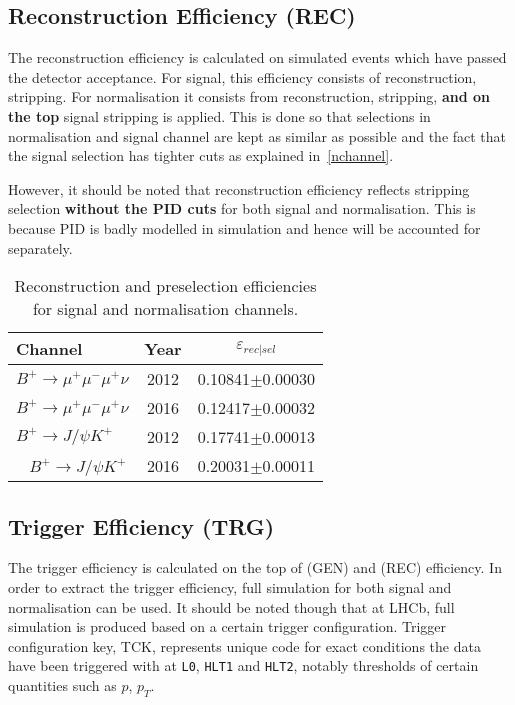 \subsection{Reconstruction Efficiency (REC)}
The reconstruction efficiency is calculated on simulated events which have passed the detector acceptance. For signal, this efficiency consists of reconstruction, stripping. For normalisation it consists from reconstruction, stripping, \textbf{and on the top} signal stripping is applied. This is done so that selections in normalisation and signal channel are kept as similar as possible and the fact that the signal selection has tighter cuts as explained in~\autoref{nchannel}.

However, it should be noted that reconstruction efficiency reflects stripping selection \textbf{without the PID cuts} for both signal and normalisation. This is because \gls{PID} is badly modelled in simulation and hence will be accounted for separately.

  \begin{table}[H]
                \begin{center}
        \begin{tabular}{l c c }

		Channel & Year & $\varepsilon_{rec|sel}$ \\ \hline
                $B^{+} \rightarrow \mu^{+} \mu^{-} \mu^{+} \nu$ & 2012 &  0.10841$\pm$0.00030 \\
                $B^{+} \rightarrow \mu^{+} \mu^{-} \mu^{+} \nu$ & 2016 &  0.12417$\pm$0.00032 \\ \hline
                $B^{+} \rightarrow J/\psi K^{+}$ & 2012 & 0.17741$\pm$0.00013 \\ \
                $B^{+} \rightarrow J/\psi K^{+}$ & 2016 &  0.20031$\pm$0.00011 \\
		
		\hline
        \end{tabular}
        \end{center}
        \caption{Reconstruction and preselection efficiencies for signal and normalisation channels.}
        \label{tab:myreco}
        \end{table}


\subsection{Trigger Efficiency (TRG)}
\label{trigef}
 The trigger efficiency is calculated on the top of (GEN) and (REC) efficiency. In order to extract the trigger efficiency, full simulation for both signal and normalisation can be used. It should be noted though that at \gls{LHCb}, full simulation is produced based on a certain trigger configuration. Trigger configuration key, TCK, represents unique code for exact conditions the data have been triggered with at \texttt{L0}, \texttt{HLT1} and \texttt{HLT2}, notably thresholds of certain quantities such as $p$, $p_{T}$. 
 
